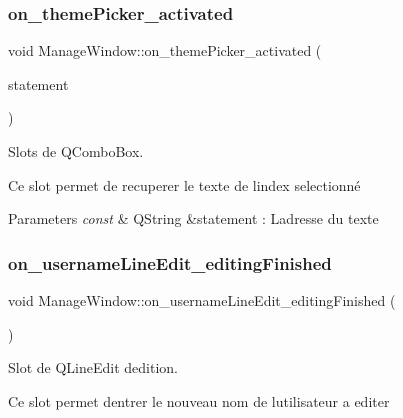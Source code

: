 \subsubsection{\texorpdfstring{on\+\_\+theme\+Picker\+\_\+activated}{on\_themePicker\_activated}}
{\footnotesize\ttfamily void Manage\+Window\+::on\+\_\+theme\+Picker\+\_\+activated (\begin{DoxyParamCaption}\item[{const Q\+String \&}]{statement }\end{DoxyParamCaption})\hspace{0.3cm}{\ttfamily [slot]}}



Slots de Q\+Combo\+Box. 

Ce slot permet de recuperer le texte de l\textquotesingle{}index selectionné 
\begin{DoxyParams}{Parameters}
{\em const} & Q\+String \&statement \+: L\textquotesingle{}adresse du texte \\
\hline
\end{DoxyParams}
\mbox{\label{classManageWindow_ac8f74ba7697067a0aaadabd04675093e}} 
\subsubsection{\texorpdfstring{on\+\_\+username\+Line\+Edit\+\_\+editing\+Finished}{on\_usernameLineEdit\_editingFinished}}
{\footnotesize\ttfamily void Manage\+Window\+::on\+\_\+username\+Line\+Edit\+\_\+editing\+Finished (\begin{DoxyParamCaption}{ }\end{DoxyParamCaption})\hspace{0.3cm}{\ttfamily [slot]}}



Slot de Q\+Line\+Edit d\textquotesingle{}edition. 

Ce slot permet d\textquotesingle{}entrer le nouveau nom de l\textquotesingle{}utilisateur a editer \mbox{\label{classManageWindow_a5aeb8691ae16f640a8d22809459a7a9d}} 
